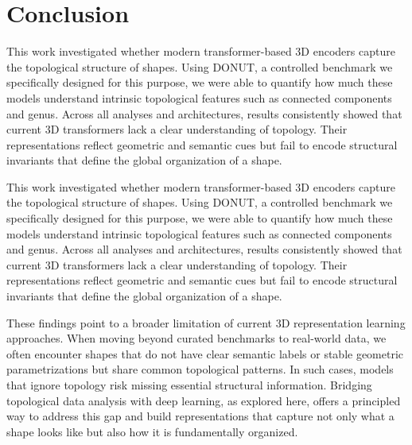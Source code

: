\section{Conclusion}

This work investigated whether modern transformer-based 3D encoders capture the topological structure of shapes. Using DONUT, a controlled benchmark we specifically designed for this purpose, we were able to quantify how much these models understand intrinsic topological features such as connected components and genus. Across all analyses and architectures, results consistently showed that current 3D transformers lack a clear understanding of topology. Their representations reflect geometric and semantic cues but fail to encode structural invariants that define the global organization of a shape.

This work investigated whether modern transformer-based 3D encoders capture the topological structure of shapes. Using DONUT, a controlled benchmark we specifically designed for this purpose, we were able to quantify how much these models understand intrinsic topological features such as connected components and genus. Across all analyses and architectures, results consistently showed that current 3D transformers lack a clear understanding of topology. Their representations reflect geometric and semantic cues but fail to encode structural invariants that define the global organization of a shape.

These findings point to a broader limitation of current 3D representation learning approaches. When moving beyond curated benchmarks to real-world data, we often encounter shapes that do not have clear semantic labels or stable geometric parametrizations but share common topological patterns. In such cases, models that ignore topology risk missing essential structural information. Bridging topological data analysis with deep learning, as explored here, offers a principled way to address this gap and build representations that capture not only what a shape looks like but also how it is fundamentally organized.